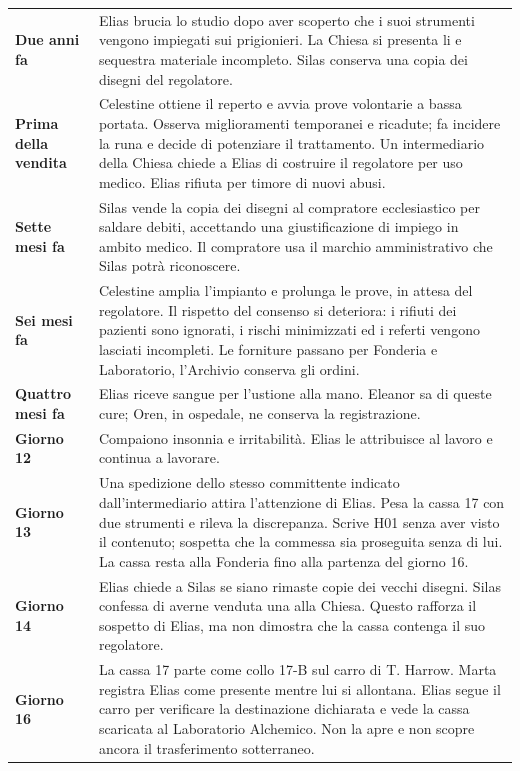 \documentclass[11pt,a4paper]{article}
\begin{document}
\begin{longtable}{>{\bfseries}p{29mm} p{126mm}}
Due anni fa & Elias brucia lo studio dopo aver scoperto che i suoi strumenti vengono impiegati sui prigionieri. La Chiesa si presenta li e sequestra materiale incompleto. Silas conserva una copia dei disegni del regolatore.\\
Prima della vendita & Celestine ottiene il reperto e avvia prove volontarie a bassa portata. Osserva miglioramenti temporanei e ricadute; fa incidere la runa e decide di potenziare il trattamento. Un intermediario della Chiesa chiede a Elias di costruire il regolatore per uso medico. Elias rifiuta per timore di nuovi abusi.\\
Sette mesi fa & Silas vende la copia dei disegni al compratore ecclesiastico per saldare debiti, accettando una giustificazione di impiego in ambito medico. Il compratore usa il marchio amministrativo che Silas potrà riconoscere.\\
Sei mesi fa & Celestine amplia l'impianto e prolunga le prove, in attesa del regolatore. Il rispetto del consenso si deteriora: i rifiuti dei pazienti sono ignorati, i rischi minimizzati ed i  referti vengono lasciati incompleti. Le forniture passano per Fonderia e Laboratorio, l'Archivio conserva gli ordini.\\
Quattro mesi fa & Elias riceve sangue per l'ustione alla mano. Eleanor sa di queste cure; Oren, in ospedale, ne conserva la registrazione.\\
Giorno 12 & Compaiono insonnia e irritabilità. Elias le attribuisce al lavoro e continua a lavorare.\\
Giorno 13 & Una spedizione dello stesso committente indicato dall'intermediario attira l'attenzione di Elias. Pesa la cassa 17 con due strumenti e rileva la discrepanza. Scrive H01 senza aver visto il contenuto; sospetta che la commessa sia proseguita senza di lui. La cassa resta alla Fonderia fino alla partenza del giorno 16.\\
Giorno 14 & Elias chiede a Silas se siano rimaste copie dei vecchi disegni. Silas confessa di averne venduta una alla Chiesa. Questo rafforza il sospetto di Elias, ma non dimostra che la cassa contenga il suo regolatore.\\
Giorno 16 & La cassa 17 parte come collo 17-B sul carro di T. Harrow. Marta registra Elias come presente mentre lui si allontana. Elias segue il carro per verificare la destinazione dichiarata e vede la cassa scaricata al Laboratorio Alchemico. Non la apre e non scopre ancora il trasferimento sotterraneo.\\

\end{longtable}
\end{document}
